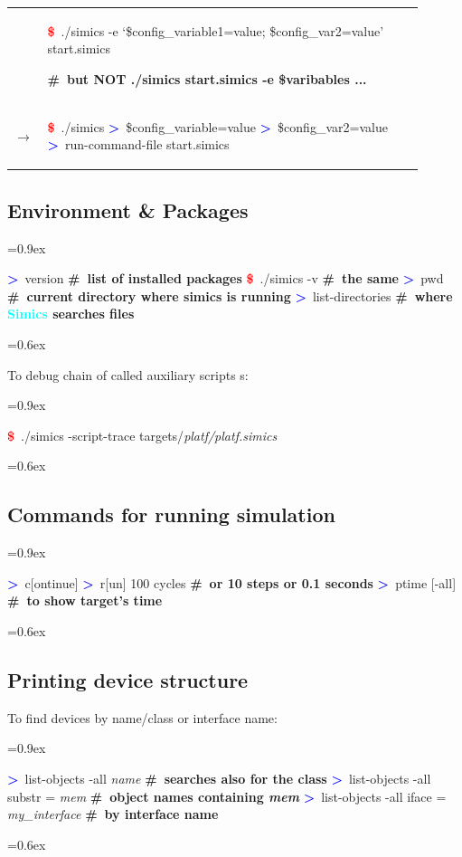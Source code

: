 \documentclass[8pt]{extarticle}
\newenvironment{code}[1][]{%
\begin{prebox}[#1]\obeylines%
\fontdimen2\font=0.9ex%
}{%
\end{prebox}%
\fontdimen2\font=0.6ex%
}
\newenvironment{codem}[2][\linewidth]{%
\begin{minipage}{#1}%
\begin{prebox}[colback=#2]\obeylines}{%
\end{prebox}%
\end{minipage}}
\newenvironment{code9}{%
\begin{codem}[0.9\linewidth]{green!10}}{\end{codem}}
\newcommand{\cod}[2][green!10]{\tcbox[
    size=fbox,
    on line,
    colback=#1,
    colframe=black,
    arc=0.3em  %
]{#2}}
\newcommand{\ind}{\hphantom{~~~}}
\newcommand{\prompt}{\textcolor{red}{\textbf{\$}\ }}
\newcommand{\sprompt}{\textcolor{blue}{\textbf{>}\ }}
\newcommand{\cmtcommon}[1]{\textcolor{Sepia}{\textbf{#1}}}
\newcommand{\cmt}[1]{\cmtcommon{\#\ #1}}
\newcommand{\p}[1]{\textit{\large#1}}
\newcommand{\Simics}{\textcolor{cyan}{\textbf{Simics}}}
\begin{document}
\begin{multicols*}{3}
\begin{tabular}{p{0.05\linewidth}p{0.85\linewidth}}
        & \begin{code9}
            \prompt ./simics -e ‘\$config_variable1=value; \$config_var2=value’ start.simics

            \cmt{but NOT ./simics start.simics -e \$varibables ...}
        \end{code9}
        \vspace{0.05cm}
        \\
        $\longrightarrow$ &
        \begin{code9}
            \prompt ./simics
            \sprompt \$config_variable=value
            \sprompt \$config_var2=value
            \sprompt run-command-file start.simics
        \end{code9}
    \end{tabular}

\subsection{Environment \& Packages}
    \begin{code}
        \sprompt version  \cmt{list of installed packages}
        \prompt ./simics -v \cmt{the same}
        \sprompt pwd \cmt{current directory where simics is running}
        \sprompt list-directories \cmt{where \Simics{} searches files}
    \end{code}


    To debug chain of called auxiliary scripts \cod{include}s:
    \begin{code}
        \prompt ./simics -script-trace targets/\p{platf/platf.simics}
    \end{code}

\subsection{Commands for running simulation}
\begin{code}
\sprompt c[ontinue]
\sprompt r[un] 100 cycles \ind \cmt{or 10 steps or 0.1 seconds}
\sprompt ptime [-all] \ind \cmt{to show target's time}
\end{code}

\subsection{Printing device structure}
To find devices by name/class or interface name:
    \begin{code}
        \sprompt list-objects -all \p{name} \ind \cmt{searches also for the class}
        \sprompt list-objects -all substr = \p{mem} \cmt{object names containing \p{mem}}
        \sprompt list-objects -all iface = \p{my_interface} \cmt{by interface name}
    \end{code}


\end{multicols*}
\end{document}
